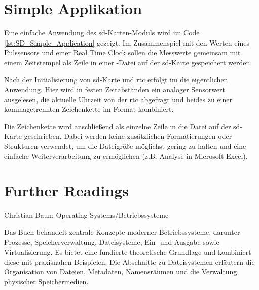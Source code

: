 \section{Simple Applikation}

Eine einfache Anwendung des \acs{sd}-Karten-Moduls wird im Code \ref{lst:SD_Simple_Application} gezeigt. Im Zusammenspiel mit den Werten eines Pulssensors und einer Real Time Clock sollen die Messwerte gemeinsam mit einem Zeitstempel als Zeile in einer -Datei auf der \acs{sd}-Karte gespeichert werden.

Nach der Initialisierung von \acs{sd}-Karte und \acs{rtc} erfolgt im  die eigentlichen Anwendung. Hier wird in festen Zeitabständen ein analoger Sensorwert ausgelesen, die aktuelle Uhrzeit von der \acs{rtc} abgefragt und beides zu einer kommagetrennten Zeichenkette im Format  kombiniert.

Die Zeichenkette wird anschließend als einzelne Zeile in die Datei  auf der \acs{sd}-Karte geschrieben. Dabei werden keine zusätzlichen Formatierungen oder Strukturen verwendet, um die Dateigröße möglichst gering zu halten und eine einfache Weiterverarbeitung zu ermöglichen (z.B. Analyse in Microsoft Excel).

{
     \label{lst:SD_Simple_Application}
}



\section{Further Readings}

Christian Baun: Operating Systems/Betriebssysteme \cite{baun_operating_2023}

\bigskip

Das Buch behandelt zentrale Konzepte moderner Betriebssysteme, darunter Prozesse, Speicherverwaltung, Dateisysteme, Ein- und Ausgabe sowie Virtualisierung. Es bietet eine fundierte theoretische Grundlage und kombiniert diese mit praxisnahen Beispielen. Die Abschnitte zu Dateisystemen erläutern die Organisation von Dateien, Metadaten, Namensräumen und die Verwaltung physischer Speichermedien.

